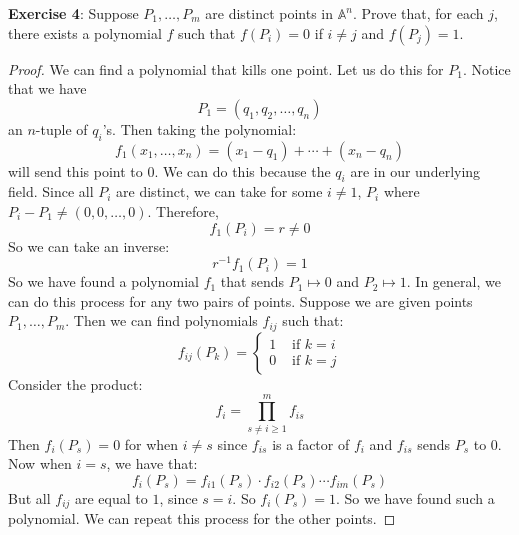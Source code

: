 \documentclass{article}
\begin{document}
\textbf{Exercise 4}: Suppose $P_{1}, \ldots , P_{m}$ are distinct points in $\mathbb{A}^{n}$. Prove that, for each $j$, there exists a polynomial $f$ such that $f(P_{i}) = 0$ if $i \neq j$ and $f(P_{j}) = 1$.
    \begin{proof}
        We can find a polynomial that kills one point. Let us do this for $P_{1}$. Notice that we have
            \begin{equation*}
                P_{1} = (q_{1}, q_{2}, \ldots , q_{n})
            \end{equation*}
        an $n$-tuple of $q_{i}$'s. Then taking the polynomial:
            \begin{equation*}
                f_{1}(x_{1}, \ldots , x_{n}) = (x_{1} - q_{1}) + \cdots + (x_{n} - q_{n})
            \end{equation*}
        will send this point to $0$. We can do this because the $q_{i}$ are in our underlying field. Since all $P_{i}$ are distinct, we can take for some $i \neq 1$, $P_{i}$ where $P_{i} - P_{1} \neq (0, 0, \ldots , 0)$. Therefore,
            \begin{equation*}
                f_{1}(P_{i}) = r \neq 0
            \end{equation*}
        So we can take an inverse:
            \begin{equation*}
                r^{-1}f_{1}(P_{i}) = 1
            \end{equation*}
        So we have found a polynomial $f_{1}$ that sends $P_{1} \mapsto  0$ and $P_{2} \mapsto 1$. In general, we can do this process for any two pairs of points. Suppose we are given points $P_{1}, \ldots , P_{m}$. Then we can find polynomials $f_{ij}$ such that:
            \begin{equation*}
                f_{ij}(P_{k}) = 
                    \begin{cases}
                        1 & \text{ if } k = i \\
                        0 & \text{ if } k = j
                    \end{cases}
            \end{equation*}
        Consider the product:
            \begin{equation*}
                f_{i} = \prod_{s \neq i \geq 1}^{m} f_{is}
            \end{equation*}
        Then $f_{i}(P_{s}) = 0$ for when $i \neq s$ since $f_{is}$ is a factor of $f_{i}$ and $f_{is}$ sends $P_{s}$ to $0$. Now when $i = s$, we have that:
            \begin{equation*}
                f_{i}(P_{s}) = f_{i1}(P_{s}) \cdot f_{i2}(P_{s}) \cdots f_{im}(P_{s})
            \end{equation*}
        But all $f_{ij}$ are equal to $1$, since $s = i$. So $f_{i}(P_{s}) = 1$. So we have found such a polynomial. We can repeat this process for the other points.
    \end{proof}
\end{document}
